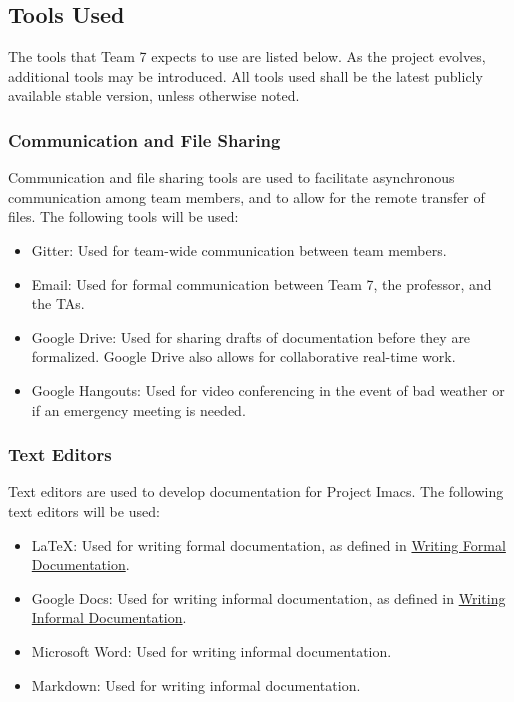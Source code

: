 \documentclass{article}
\begin{document}
\subsection{Tools Used}
The tools that Team 7 expects to use are listed below. As the project evolves, additional tools may be introduced. All tools used shall be the latest publicly available stable version, unless otherwise noted.

\subsubsection{Communication and File Sharing}
Communication and file sharing tools are used to facilitate asynchronous communication among team members, and to allow for the remote transfer of files. The following tools will be used:

\begin{itemize}
\item Gitter: Used for team-wide communication between team members.
\item Email: Used for formal communication between Team 7, the professor, and the TAs.
\item Google Drive: Used for sharing drafts of documentation before they are formalized. Google Drive also allows for collaborative real-time work.
\item Google Hangouts: Used for video conferencing in the event of bad weather or if an emergency meeting is needed.
\end{itemize}

\subsubsection{Text Editors}
Text editors are used to develop documentation for Project Imacs. The following text editors will be used:

\begin{itemize}
\item LaTeX: Used for writing formal documentation, as defined in \hyperref[sec:formal-documentation]{Writing Formal Documentation}.
\item Google Docs: Used for writing informal documentation, as defined in \hyperref[sec:informal-documentation]{Writing Informal Documentation}.
\item Microsoft Word: Used for writing informal documentation.
\item Markdown: Used for writing informal documentation.
\end{itemize}
\end{document}
